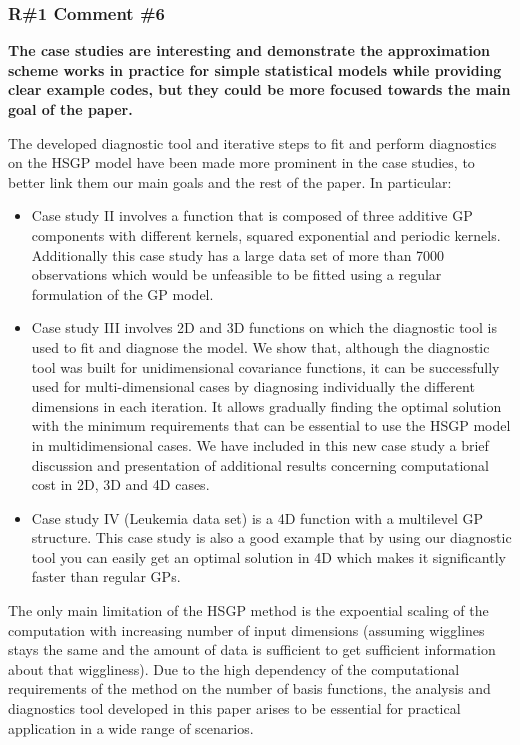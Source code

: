 \documentclass[11pt]{report}
\begin{document}
\subsubsection*{R\#1 Comment \#6}

\textbf{The case studies are interesting and demonstrate the approximation scheme works in practice for simple statistical models while providing clear example codes, but they could be more focused towards the main goal of the paper.}

The developed diagnostic tool and iterative steps to fit and perform diagnostics on the HSGP model have been made more prominent in the case studies, to better link them our main goals and the rest of the paper. In particular:


\begin{itemize}

\item Case study II involves a function that is composed of three additive GP components with different kernels, squared exponential and periodic kernels. Additionally this case study has a large data set of more than 7000 observations which would be unfeasible to be fitted using a regular formulation of the GP model.

\item Case study III involves 2D and 3D functions on which the diagnostic tool is used to fit and diagnose the model. We show that, although the diagnostic tool was built for unidimensional covariance functions, it can be successfully used for multi-dimensional cases by diagnosing individually the different dimensions in each iteration. It allows gradually finding the optimal solution with the minimum requirements that can be essential to use the HSGP model in multidimensional cases. We have included in this new case study a brief discussion and presentation of additional results concerning computational cost in 2D, 3D and 4D cases.

\item Case study IV (Leukemia data set) is a 4D function with a multilevel GP structure. This case study is also a good example that by using our diagnostic tool you can easily get an optimal solution in 4D which makes it significantly faster than regular GPs.
\end{itemize}

The only main limitation of the HSGP method is the expoential scaling of the computation with increasing number of input dimensions (assuming wigglines stays the same and the amount of data is sufficient to get sufficient information about that wiggliness). 
Due to the high dependency of the computational requirements of the method on the number of basis functions, the analysis and diagnostics tool developed in this paper arises to be essential for practical application in a wide range of scenarios. 
\end{document}
